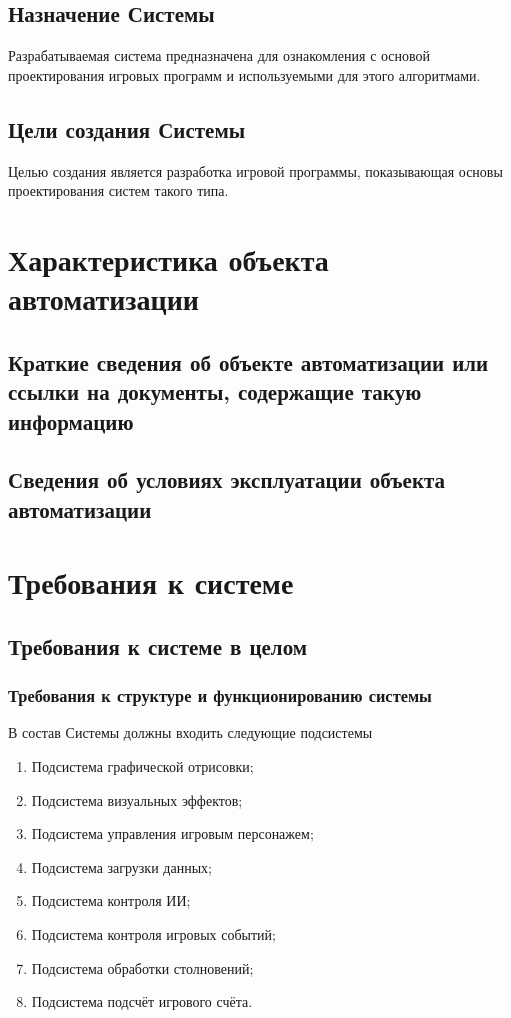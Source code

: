 \section{Назначение Системы}
Разрабатываемая система предназначена для ознакомления с основой проектирования игровых программ и 
используемыми для этого алгоритмами.

\section{Цели создания Системы}
Целью создания является разработка игровой программы, показывающая основы проектирования систем 
такого типа.

\chapter{Характеристика объекта автоматизации}
\section{Краткие сведения об объекте автоматизации или ссылки на документы, содержащие такую 
    информацию}
\section{Сведения об условиях эксплуатации объекта автоматизации}

\chapter{Требования к системе}
\section{Требования к системе в целом}
\subsection{Требования к структуре и функционированию системы}
В состав Системы должны входить следующие подсистемы
\begin{enumerate}
    \item Подсистема графической отрисовки;
    \item Подсистема визуальных эффектов;
    \item Подсистема управления игровым персонажем;
    \item Подсистема загрузки данных;
    \item Подсистема контроля ИИ;
    \item Подсистема контроля игровых событий;
    \item Подсистема обработки столновений;
    \item Подсистема подсчёт игрового счёта.
\end{enumerate}

